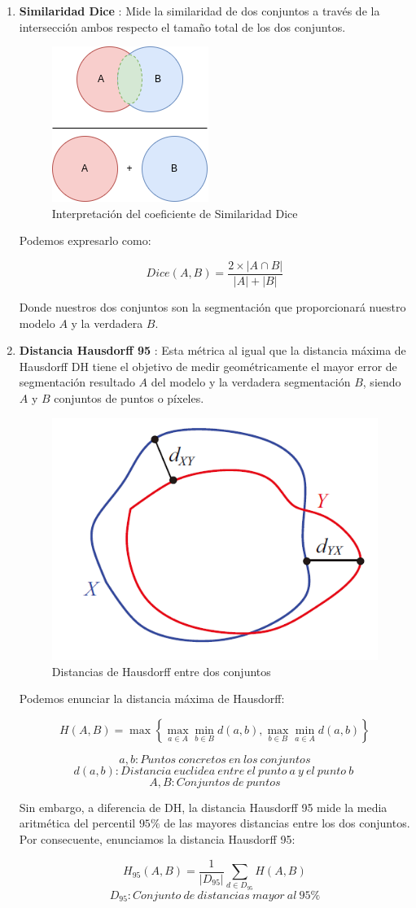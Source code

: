 \begin{enumerate}
	\item \textbf{Similaridad Dice} : Mide la similaridad de dos conjuntos a través de la intersección ambos respecto el tamaño total de los dos conjuntos.
	 
	\begin{figure}[!h]
		\centering
		\includegraphics[width=0.25\linewidth]{imagenes/dicesimilarity.drawio.png}
		\caption{Interpretación del coeficiente de Similaridad Dice}
	\end{figure}
	
	Podemos expresarlo como:
	
	$$ Dice(A, B) = \frac{2 \times |A \cap B|}{|A| + |B|} $$
	
	Donde nuestros dos conjuntos son la segmentación que proporcionará nuestro modelo $A$ y la verdadera $B$.
	
	\item \textbf{Distancia Hausdorff 95} : Esta métrica al igual que la distancia máxima de Hausdorff DH tiene el objetivo de medir geométricamente el mayor error de segmentación resultado $A$ del modelo y la verdadera segmentación $B$, siendo $A$ y $B$ conjuntos de puntos o píxeles.
	
	\begin{figure}[!h]
		\centering
		\includegraphics[width=0.4\linewidth]{imagenes/distanceHaussdorff.png}
		\caption{Distancias de Hausdorff entre dos conjuntos}
	\end{figure}
	
	Podemos enunciar la distancia máxima de Hausdorff:
	
	
	$$ H(A, B) = \max \left\{ \max_{a \in A} \min_{b \in B} d(a, b), \max_{b \in B} \min_{a \in A} d(a, b) \right\} $$
	
	$$ a, b  : Puntos\ concretos\ en\ los\ conjuntos $$
	$$ d(a, b) : Distancia\ euclidea\ entre\ el\ punto\ a\ y\ el\ punto\ b\ $$
	$$ A, B : Conjuntos\ de\ puntos $$
	
	
	Sin embargo, a diferencia de DH, la distancia Hausdorff 95  mide la media aritmética del percentil $95 \%$ de las mayores distancias entre los dos conjuntos. Por consecuente, enunciamos la distancia Hausdorff 95:
	
	$$ H_{95}(A, B) = \frac{1}{|D_{95}|} \sum_{d \in D_{95}} H(A, B) $$ 
	$$ D_{95}  : Conjunto\ de\ distancias\ mayor\ al\ 95\% $$
	
\end{enumerate}
